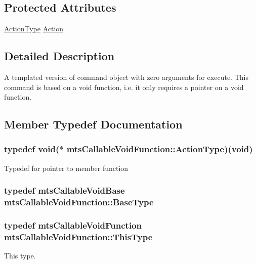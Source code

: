 \subsection*{Protected Attributes}
\begin{DoxyCompactItemize}
\item 
\hyperlink{classmts_callable_void_function_a2a31c549f68b956f3f2429cfee3f7c9f}{Action\-Type} \hyperlink{classmts_callable_void_function_a61118c744dd0d62db9f06ba75fbfe292}{Action}
\end{DoxyCompactItemize}


\subsection{Detailed Description}
A templated version of command object with zero arguments for execute. This command is based on a void function, i.\-e. it only requires a pointer on a void function. 

\subsection{Member Typedef Documentation}
\hypertarget{classmts_callable_void_function_a2a31c549f68b956f3f2429cfee3f7c9f}{
\subsubsection[{Action\-Type}]{\setlength{\rightskip}{0pt plus 5cm}typedef void($\ast$ mts\-Callable\-Void\-Function\-::\-Action\-Type)(void)}}\label{classmts_callable_void_function_a2a31c549f68b956f3f2429cfee3f7c9f}
Typedef for pointer to member function \hypertarget{classmts_callable_void_function_a9a675710ec6f9f9e3bd9ed8b22755585}{
\subsubsection[{Base\-Type}]{\setlength{\rightskip}{0pt plus 5cm}typedef {\bf mts\-Callable\-Void\-Base} {\bf mts\-Callable\-Void\-Function\-::\-Base\-Type}}}\label{classmts_callable_void_function_a9a675710ec6f9f9e3bd9ed8b22755585}
\hypertarget{classmts_callable_void_function_a4885dc4c6ac40e229baca8146d328ae1}{
\subsubsection[{This\-Type}]{\setlength{\rightskip}{0pt plus 5cm}typedef {\bf mts\-Callable\-Void\-Function} {\bf mts\-Callable\-Void\-Function\-::\-This\-Type}}}\label{classmts_callable_void_function_a4885dc4c6ac40e229baca8146d328ae1}
This type. 

